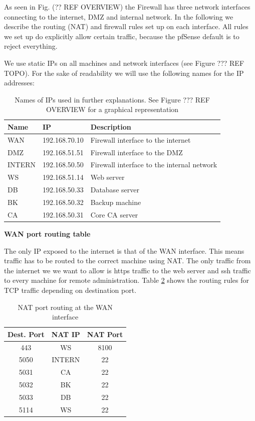 \documentclass[english]{article}
\begin{document}
As seen in Fig. (?? REF OVERVIEW) the Firewall has three network interfaces connecting to the internet, DMZ and internal network. In the following we describe the routing (NAT) and firewall rules set up on each interface. All rules we set up do explicitly allow certain traffic, because the pfSense default is to reject everything.

We use static IPs on all machines and network interfaces (see Figure ??? REF TOPO). For the sake of readability we will use the following names for the IP addresses:

\begin{table}[h]
\centering
\begin{tabular}{|l|l|l|}
\hline
\textbf{Name} & \textbf{IP} & \textbf{Description} \\ \hline
WAN & 192.168.70.10 & Firewall interface to the internet \\ \hline
DMZ & 192.168.51.51 & Firewall interface to the DMZ \\ \hline
INTERN & 192.168.50.50 & Firewall interface to the internal network \\ \hline
WS & 192.168.51.14 & Web server \\ \hline
DB & 192.168.50.33 & Database server \\ \hline
BK & 192.168.50.32 & Backup machine \\ \hline
CA & 192.168.50.31 & Core CA server \\ \hline

\end{tabular}
\caption{Names of IPs used in further explanations. See Figure ??? REF OVERVIEW for a graphical representation}
\label{fw_ip_names}
\end{table}


\textbf{WAN port routing table}

The only IP exposed to the internet is that of the WAN interface. This means traffic has to be routed to the correct machine using NAT. The only traffic from the internet we we want to allow is https traffic to the web server and ssh traffic to every machine for remote administration. Table \ref{fw_inet_nat} shows the routing rules for TCP traffic depending on destination port.

\begin{table}[h]
\centering
\begin{tabular}{|c||c|c|}
\hline
\textbf{Dest. Port} & \textbf{NAT IP} & \textbf{NAT Port} \\ \hline
443 & WS & 8100 \\ \hline
5050 & INTERN & 22 \\ \hline
5031 & CA & 22 \\ \hline
5032 & BK & 22 \\ \hline
5033 & DB & 22 \\ \hline
5114 & WS & 22 \\ \hline

\end{tabular}
\caption{NAT port routing at the WAN interface}
\label{fw_inet_nat}
\end{table}
\end{document}
